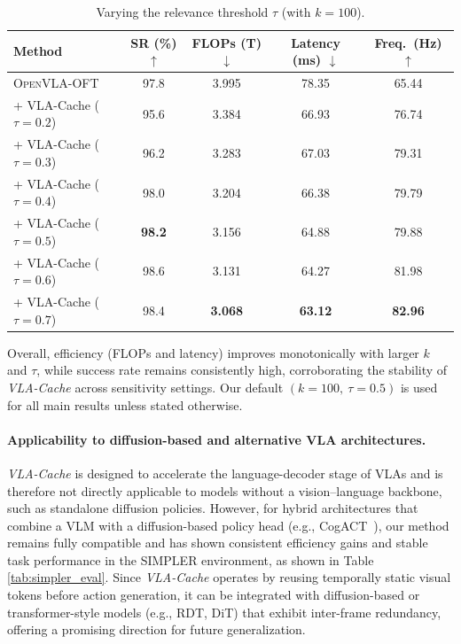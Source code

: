 \begin{table}[h]
\centering
\setlength{\tabcolsep}{8pt}
\begin{tabular}{lcccc}
\toprule
Method & SR (\%) $\uparrow$ & FLOPs (T) $\downarrow$ & Latency (ms) $\downarrow$ & Freq.\ (Hz) $\uparrow$ \\
\midrule
\textsc{OpenVLA-OFT} & 97.8 & 3.995 & 78.35 & 65.44 \\
\quad + VLA-Cache ($\tau{=}0.2$) & 95.6 & 3.384 & 66.93 & 76.74 \\
\quad + VLA-Cache ($\tau{=}0.3$) & 96.2 & 3.283 & 67.03 & 79.31 \\
\quad + VLA-Cache ($\tau{=}0.4$) & 98.0 & 3.204 & 66.38 & 79.79 \\
\quad + VLA-Cache ($\tau{=}0.5$) & \textbf{98.2} & 3.156 & 64.88 & 79.88 \\
\quad + VLA-Cache ($\tau{=}0.6$) & 98.6 & 3.131 & 64.27 & 81.98 \\
\quad + VLA-Cache ($\tau{=}0.7$) & 98.4 & \textbf{3.068} & \textbf{63.12} & \textbf{82.96} \\
\bottomrule
\end{tabular}
\caption{Varying the relevance threshold $\tau$ (with $k{=}100$).}
\label{tab:tau_sweep}
\end{table}

\noindent
Overall, efficiency (FLOPs and latency) improves monotonically with larger $k$ and $\tau$, while success rate remains consistently high, corroborating the stability of \emph{VLA-Cache} across sensitivity settings. Our default $(k{=}100,\ \tau{=}0.5)$ is used for all main results unless stated otherwise.

\paragraph{Applicability to diffusion-based and alternative VLA architectures.}
\emph{VLA-Cache} is designed to accelerate the language-decoder stage of VLAs and is therefore not directly applicable to models without a vision–language backbone, such as standalone diffusion policies. However, for hybrid architectures that combine a VLM with a diffusion-based policy head (e.g., CogACT~\cite{li2024cogact}), our method remains fully compatible and has shown consistent efficiency gains and stable task performance in the SIMPLER environment, as shown in Table \ref{tab:simpler_eval}. Since \emph{VLA-Cache} operates by reusing temporally static visual tokens before action generation, it can be integrated with diffusion-based or transformer-style models (e.g., RDT, DiT) that exhibit inter-frame redundancy, offering a promising direction for future generalization.

